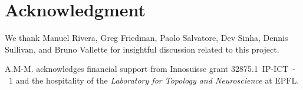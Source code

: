 
\section*{Acknowledgment}

We thank Manuel Rivera, Greg Friedman, Paolo Salvatore, Dev Sinha, Dennis Sullivan, and Bruno Vallette for insightful discussion related to this project.

A.M-M. acknowledges financial support from Innosuisse grant 32875.1~IP-ICT~-~1 and the hospitality of the \textit{Laboratory for Topology and Neuroscience} at EPFL.

